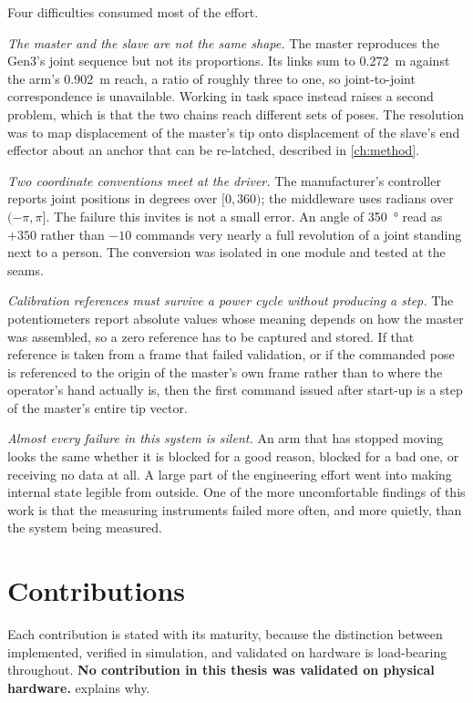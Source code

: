 Four difficulties consumed most of the effort.

\emph{The master and the slave are not the same shape.} The master reproduces
the Gen3's joint sequence but not its proportions. Its links sum to
\SI{0.272}{\metre} against the arm's \SI{0.902}{\metre} reach, a ratio of
roughly three to one, so joint-to-joint correspondence is unavailable. Working
in task space instead raises a second problem, which is that the two chains
reach different sets of poses. The resolution was to map displacement of the
master's tip onto displacement of the slave's end effector about an anchor
that can be re-latched, described in \cref{ch:method}.

\emph{Two coordinate conventions meet at the driver.} The manufacturer's
controller reports joint positions in degrees over $[0, 360)$; the middleware
uses radians over $(-\pi, \pi]$. The failure this invites is not a small
error. An angle of \SI{350}{\degree} read as $+350$ rather than $-10$ commands
very nearly a full revolution of a joint standing next to a person. The
conversion was isolated in one module and tested at the seams.

\emph{Calibration references must survive a power cycle without producing a
step.} The potentiometers report absolute values whose meaning depends on how
the master was assembled, so a zero reference has to be captured and stored.
If that reference is taken from a frame that failed validation, or if the
commanded pose is referenced to the origin of the master's own frame rather
than to where the operator's hand actually is, then the first command issued
after start-up is a step of the master's entire tip vector.

\emph{Almost every failure in this system is silent.} An arm that has stopped
moving looks the same whether it is blocked for a good reason, blocked for a
bad one, or receiving no data at all. A large part of the engineering effort
went into making internal state legible from outside. One of the more
uncomfortable findings of this work is that the measuring instruments failed
more often, and more quietly, than the system being measured.

\section{Contributions}

Each contribution is stated with its maturity, because the distinction between
implemented, verified in simulation, and validated on hardware is load-bearing
throughout. \textbf{No contribution in this thesis was validated on physical
hardware.}  explains why.

